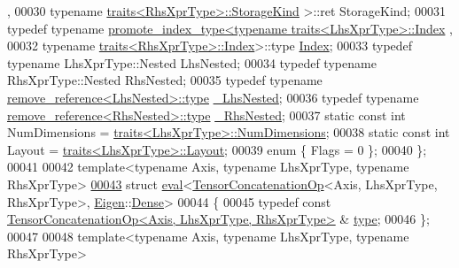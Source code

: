 \begin{DoxyCode}
      ,
00030                                         \textcolor{keyword}{typename} \hyperlink{struct_eigen_1_1internal_1_1traits}{traits<RhsXprType>::StorageKind}
      >::ret StorageKind;
00031   \textcolor{keyword}{typedef} \textcolor{keyword}{typename} \hyperlink{struct_eigen_1_1internal_1_1promote__index__type}{promote\_index\_type<typename traits<LhsXprType>::Index}
      ,
00032                                       \textcolor{keyword}{typename} \hyperlink{struct_eigen_1_1internal_1_1traits}{traits<RhsXprType>::Index}>::type 
      \hyperlink{namespace_eigen_a62e77e0933482dafde8fe197d9a2cfde}{Index};
00033   \textcolor{keyword}{typedef} \textcolor{keyword}{typename} LhsXprType::Nested LhsNested;
00034   \textcolor{keyword}{typedef} \textcolor{keyword}{typename} RhsXprType::Nested RhsNested;
00035   \textcolor{keyword}{typedef} \textcolor{keyword}{typename} \hyperlink{group___sparse_core___module}{remove\_reference<LhsNested>::type} 
      \hyperlink{group___sparse_core___module}{\_LhsNested};
00036   \textcolor{keyword}{typedef} \textcolor{keyword}{typename} \hyperlink{group___sparse_core___module}{remove\_reference<RhsNested>::type} 
      \hyperlink{group___sparse_core___module}{\_RhsNested};
00037   \textcolor{keyword}{static} \textcolor{keyword}{const} \textcolor{keywordtype}{int} NumDimensions = \hyperlink{struct_eigen_1_1internal_1_1traits}{traits<LhsXprType>::NumDimensions};
00038   \textcolor{keyword}{static} \textcolor{keyword}{const} \textcolor{keywordtype}{int} Layout = \hyperlink{struct_eigen_1_1internal_1_1traits}{traits<LhsXprType>::Layout};
00039   \textcolor{keyword}{enum} \{ Flags = 0 \};
00040 \};
00041 
00042 \textcolor{keyword}{template}<\textcolor{keyword}{typename} Axis, \textcolor{keyword}{typename} LhsXprType, \textcolor{keyword}{typename} RhsXprType>
\hyperlink{struct_eigen_1_1internal_1_1eval_3_01_tensor_concatenation_op_3_01_axis_00_01_lhs_xpr_type_00_014584aefce4bd43d98989ef5eac495878}{00043} \textcolor{keyword}{struct }\hyperlink{struct_eigen_1_1internal_1_1eval}{eval}<\hyperlink{class_eigen_1_1_tensor_concatenation_op}{TensorConcatenationOp}<Axis, LhsXprType, RhsXprType>, 
      \hyperlink{namespace_eigen}{Eigen}::\hyperlink{struct_eigen_1_1_dense}{Dense}>
00044 \{
00045   \textcolor{keyword}{typedef} \textcolor{keyword}{const} \hyperlink{class_eigen_1_1_tensor_concatenation_op}{TensorConcatenationOp<Axis, LhsXprType, RhsXprType>}
      & \hyperlink{class_eigen_1_1_tensor_concatenation_op}{type};
00046 \};
00047 
00048 \textcolor{keyword}{template}<\textcolor{keyword}{typename} Axis, \textcolor{keyword}{typename} LhsXprType, \textcolor{keyword}{typename} RhsXprType>

\end{DoxyCode}
